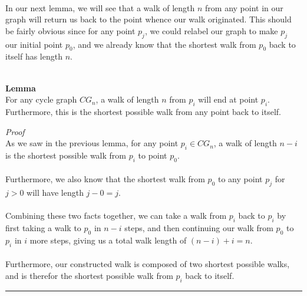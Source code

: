 \documentclass[a4paper,12pt]{article}
\begin{document}
\\
In our next lemma, we will see that a walk of length $n$ from any point in our graph will return us back to the point whence our walk originated. This should be fairly obvious since for any point $p_j$, we could relabel our graph to make $p_j$ our initial point $p_0$, and we already know that the shortest walk from $p_0$ back to itself has length $n$.\\
\\
\begin{tcolorbox}
\textbf{Lemma}\\
For any cycle graph $CG_n$, a walk of length $n$ from $p_i$ will end at point $p_i$. Furthermore, this is the shortest possible walk from any point back to itself.
\end{tcolorbox}
\noindent
\textit{Proof}\\
As we saw in the previous lemma, for any point $p_i \in CG_n$, a walk of length $n - i$ is the shortest possible walk from $p_i$ to point $p_0$.\\
\\
Furthermore, we also know that the shortest walk from $p_0$ to any point $p_j$ for $j > 0$ will have length $j - 0 = j$.\\
\\
Combining these two facts together, we can take a walk from $p_i$ back to $p_i$ by first taking a walk to $p_0$ in $n - i$ steps, and then continuing our walk from $p_0$ to $p_i$ in $i$ more steps, giving us a total walk length of $(n - i) + i = n$.\\
\\
Furthermore, our constructed walk is composed of two shortest possible walks, and is therefor the shortest possible walk from $p_i$ back to itself.
\begin{center}
\noindent\rule{8cm}{0.4pt}
\end{center} 
\end{document}
